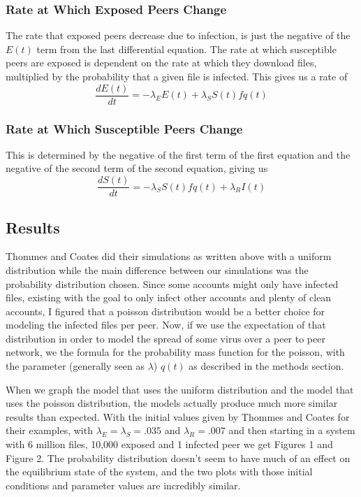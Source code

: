 \documentclass[12pt, oneside]{article}
\begin{document}
        \subsubsection{Rate at Which Exposed Peers Change}
        The rate that exposed peers decrease due to infection, is just the negative of the $E(t)$ term from the last differential equation.
        The rate at which susceptible peers are exposed is dependent on the rate at which they download files, multiplied by the probability
        that a given file is infected. This gives us a rate of \[
            \frac{dE(t)}{dt}=-\lambda_E E(t)+\lambda_S S(t)f{q(t)}
        \]
        \subsubsection{Rate at Which Susceptible Peers Change}
        This is determined by the negative of the first term of the first equation and the negative of the second term of the second equation, giving us
        \[
            \frac{dS(t)}{dt}=-\lambda_S S(t)f{q(t)}+\lambda_R I(t)
        \]
    \subsection{Results}
    Thommes and Coates did their simulations as written above with a uniform distribution while the main difference between our simulations was the probability distribution chosen.
    Since some accounts might only have infected files, existing with the goal to only infect other accounts and plenty of clean accounts, I figured that a poisson distribution
    would be a better choice for modeling the infected files per peer. Now, if we use the expectation of that distribution in order to model the spread of some 
    virus over a peer to peer network, we the formula for the probability mass function for the poisson, with
    the parameter (generally seen as $\lambda$) $q(t)$ as described in the methods section.

    When we graph the model that uses the uniform distribution and the model that uses the poisson distribution, the models actually produce much more
    similar results than expected. With the initial values given by Thommes and Coates 
    for their examples, with $\lambda_E=\lambda_S=.035$ and  $\lambda_R = .007$ and then starting in a system with 6 million files, 10,000 exposed and 1 infected peer
    we get Figures 1 and Figure 2. The probability distribution doesn't seem to have much of an effect on the equilibrium state of the system, and the two plots with
    those initial conditions and parameter values are incredibly similar.
\end{document}
